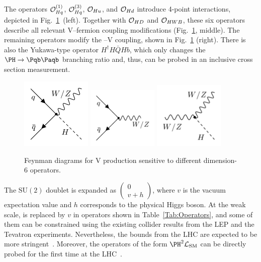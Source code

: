 \documentclass[a4paper,11pt]{article}
\newcommand{\Pb}{{{\Pqb}}\xspace}
\newcommand{\PAb}{{{{\Paqb}}}\xspace}
\renewcommand{\PV}{{{{V}}}\xspace}
\newcommand{\VH}{{{\PV}{\PH}}\xspace}
\begin{document}
The operators ${\cal O}^{(1)}_{Hq}$, ${\cal O}^{(3)}_{Hq}$, ${\cal O}_{Hu}$, and ${\cal O}_{Hd}$ introduce 4-point interactions, depicted in Fig.~\ref{fig:Feynman_digarams}~(left). 
Together with ${\cal O}_{HD}$ and ${\cal O}_{HWB}$, these six operators describe all relevant {\PV}--fermion coupling modifications (Fig.~\ref{fig:Feynman_digarams}, middle). 
The remaining operators modify the \PH--\PV coupling, shown in Fig.~\ref{fig:Feynman_digarams} (right). 
There is also the Yukawa-type operator $H^\dagger H \bar{Q}H b$, which only changes the $\PH \to \Pb \PAb$ branching ratio and, thus, can be probed in an inclusive cross section measurement. 
\begin{figure}[hbtp]
\begin{center}
\includegraphics[width=0.3\textwidth]{Figures/New/LHE//qqVH.png}
\includegraphics[width=0.3\textwidth]{Figures/New/LHE//qqV.png}
\includegraphics[width=0.3\textwidth]{Figures/New/LHE//VVh.png}
\end{center}
\caption{
Feynman diagrams for \VH production sensitive to different dimension-6 operators.
}
\label{fig:Feynman_digarams}
\end{figure}
The $\textrm{SU}(2)$ doublet \PH is expanded as $\begin{pmatrix} 0 \\ v+h \end{pmatrix}$, where $v$ is the vacuum expectation value  and $h$ corresponds to the physical Higgs boson.
At the weak scale,  \PH is replaced by $v$ in operators shown in Table~\ref{Tab:Operators}, and some of them can be constrained using the existing collider results from  the LEP and the Tevatron experiments.
Nevertheless, the bounds from the LHC are expected to be more stringent~\cite{Ellis:2014jta,Grojean:2018dqj}.
Moreover, the operators of the form ${\PH}^2\mathcal{L}_{\text{SM}}$ can be directly probed for the first time at the LHC~\cite{Gupta:2014rxa}. 
\end{document}
